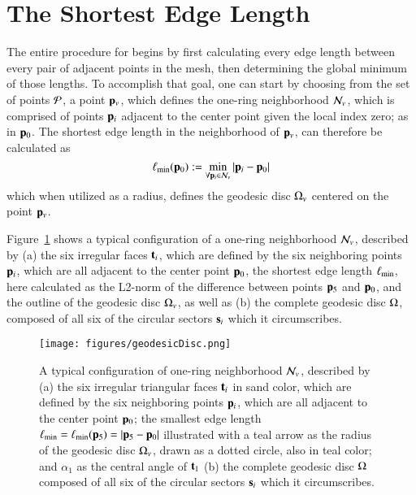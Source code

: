\section{The Shortest Edge Length}
\label{ch4sSEL}
The entire procedure for  begins by first calculating every edge length between every pair of adjacent points in the mesh, then determining the global minimum of those lengths. To accomplish that goal, one can start by choosing from the set of points $\mathcal{P}$, a point $\mathbf{p}_v$, which defines the one-ring neighborhood $\mathcal{N}_v$, which is comprised of points $\mathbf{p}_i$ adjacent to the center point given the local index zero; as in $\mathbf{p}_0$. The shortest edge length in the neighborhood of $\mathbf{p}_v$, can therefore be calculated as
%
\begin{equation}
	\ell_\text{min}(\mathbf{p}_0) := \min_{\forall \mathbf{p}_i \in \mathcal{N}_v}|\mathbf{p}_i - \mathbf{p}_0|
	\label{eq:localMinimumEdgeLength}
\end{equation}%
%
%
%
which when utilized as a radius, defines the geodesic disc $\Omega_v$ centered on the point $\mathbf{p}_v$.

Figure~\ref{fig:geodesicDisc} shows a typical configuration of a one-ring neighborhood $\mathcal{N}_v$, described by (a) the six irregular faces $\mathbf{t}_i$, which are defined by the six neighboring points $\mathbf{p}_i$, which are all adjacent to the center point $\mathbf{p}_0$, the shortest edge length $\ell_\text{min}$, here calculated as the L2-norm of the difference between points $\mathbf{p}_5$ and $\mathbf{p}_0$, and the outline of the geodesic disc $\Omega_v$, as well as (b) the complete geodesic disc $\Omega$, composed of all six of the circular sectors $\mathbf{s}_i$ which it circumscribes.

\begin{figure}[ht]
\ffigbox
	{\texttt{[image: figures/geodesicDisc.png]}}
	{\caption[One-ring and geodesic disc]{A typical configuration of one-ring neighborhood $\mathcal{N}_v$, described by (a) the six irregular triangular faces $\mathbf{t}_i$ in sand color, which are defined by the six neighboring points $\mathbf{p}_i$, which are all adjacent to the center point $\mathbf{p}_0$; the smallest edge length $\ell_\text{min} = \ell_\text{min}(\mathbf{p}_5) = |\mathbf{p}_5 - \mathbf{p}_0|$ illustrated with a teal arrow as the radius of the geodesic disc $\Omega_v$, drawn as a dotted circle, also in teal color; and $\alpha_1$ as the central angle of $\mathbf{t}_1$ (b) the complete geodesic disc $\Omega$ composed of all six of the circular sectors $\mathbf{s}_i$ which it circumscribes.}\label{fig:geodesicDisc}}
\end{figure}%

